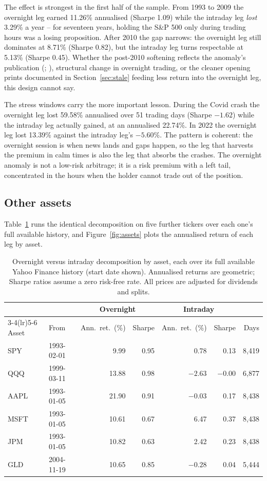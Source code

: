 \documentclass[11pt]{article}
\begin{document}
The effect is strongest in the first half of the sample. From 1993 to 2009 the overnight leg earned 11.26\% annualised (Sharpe 1.09) while the intraday leg \emph{lost} 3.29\% a year -- for seventeen years, holding the S\&P 500 only during trading hours was a losing proposition. After 2010 the gap narrows: the overnight leg still dominates at 8.71\% (Sharpe 0.82), but the intraday leg turns respectable at 5.13\% (Sharpe 0.45). Whether the post-2010 softening reflects the anomaly's publication (\citealp{cooper2008}; \citealp{lou2019}), structural change in overnight trading, or the cleaner opening prints documented in Section~\ref{sec:stale} feeding less return into the overnight leg, this design cannot say.

The stress windows carry the more important lesson. During the Covid crash the overnight leg lost 59.58\% annualised over 51 trading days (Sharpe $-1.62$) while the intraday leg actually gained, at an annualised 22.74\%. In 2022 the overnight leg lost 13.39\% against the intraday leg's $-5.60$\%. The pattern is coherent: the overnight session is when news lands and gaps happen, so the leg that harvests the premium in calm times is also the leg that absorbs the crashes. The overnight anomaly is not a low-risk arbitrage; it is a risk premium with a left tail, concentrated in the hours when the holder cannot trade out of the position.

\subsection{Other assets}

Table~\ref{tab:assets} runs the identical decomposition on five further tickers over each one's full available history, and Figure~\ref{fig:assets} plots the annualised return of each leg by asset.

\begin{table}[t]
\centering
\caption{Overnight versus intraday decomposition by asset, each over its full available Yahoo Finance history (start date shown). Annualised returns are geometric; Sharpe ratios assume a zero risk-free rate. All prices are adjusted for dividends and splits.}
\label{tab:assets}
\begin{tabular}{llrrrrr}
\toprule
 & & \multicolumn{2}{c}{Overnight} & \multicolumn{2}{c}{Intraday} & \\
\cmidrule(lr){3-4}\cmidrule(lr){5-6}
Asset & From & Ann.\ ret.\ (\%) & Sharpe & Ann.\ ret.\ (\%) & Sharpe & Days \\
\midrule
SPY & 1993-02-01 & 9.99 & 0.95 & 0.78 & 0.13 & 8,419 \\
QQQ & 1999-03-11 & 13.88 & 0.98 & $-2.63$ & $-0.00$ & 6,877 \\
AAPL & 1993-01-05 & 21.90 & 0.91 & $-0.03$ & 0.17 & 8,438 \\
MSFT & 1993-01-05 & 10.61 & 0.67 & 6.47 & 0.37 & 8,438 \\
JPM & 1993-01-05 & 10.82 & 0.63 & 2.42 & 0.23 & 8,438 \\
GLD & 2004-11-19 & 10.65 & 0.85 & $-0.28$ & 0.04 & 5,444 \\
\bottomrule
\end{tabular}
\end{table}
\end{document}
